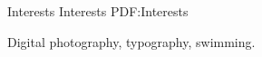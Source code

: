 
\Section
{Interests}
{Interests}
{PDF:Interests}

\Entry
Digital photography,
typography,
swimming.